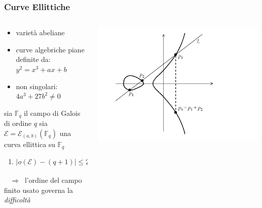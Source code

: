 \begin{frame}
	\frametitle{Curve Ellittiche}

\begin{columns}
	\begin{column}{.65\textwidth}

		\begin{itemize}
			\item varietà abeliane 
			\item curve algebriche piane definite da: $y^2=x^3+ax+b$
			\item non singolari: $4a^3+27b^2\neq 0$
		\end{itemize}

		\begin{theorem}[Hasse]
			 sia $\mathbb{F}_q$ il campo di Galois di ordine $q$ 
			 \newline sia $\mathcal{E}=\mathcal{E}_{(a,b)}(\mathbb{F}_q)$ una curva ellittica su $\mathbb{F}_q$ 
			\vspace*{4pt}
			\begin{enumerate}
				\item $|o(\mathcal{E})-(q+1)|\leq2\sqrt q$
			\end{enumerate}	
		\end{theorem} 
		$\;\;\;\Rightarrow\;\;$l'ordine del campo finito usato governa la \textit{difficoltà}

	\end{column}

	\begin{column}{.4\textwidth}
		\includegraphics[height = 5 cm]{images/eca.png}
	\end{column}
\end{columns}

\end{frame}
